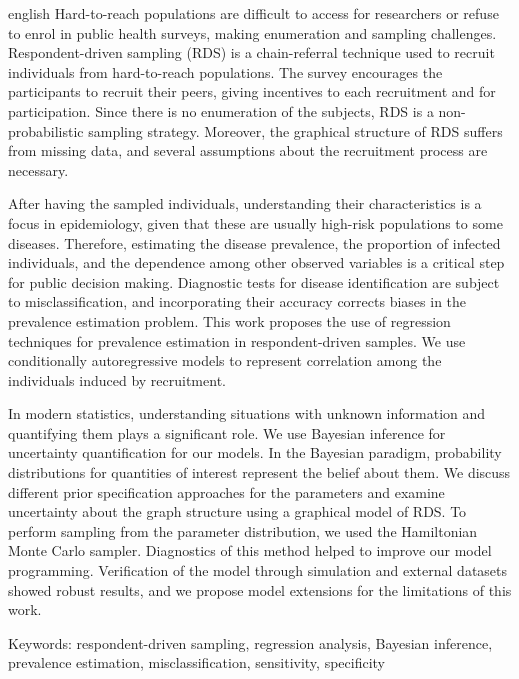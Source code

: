 \setlength{\absparsep}{18pt} 

\begin{resumo}[Abstract]
 \begin{otherlanguage*}{english}
    Hard-to-reach populations are difficult to access for researchers or refuse to enrol in public health surveys, making enumeration and sampling challenges. Respondent-driven sampling (RDS) is a chain-referral technique used to recruit individuals from hard-to-reach populations. The survey encourages the participants to recruit their peers, giving incentives to each recruitment and for participation. Since there is no enumeration of the subjects, RDS is a non-probabilistic sampling strategy. Moreover, the graphical structure of RDS suffers from missing data, and several assumptions about the recruitment process are necessary. 
    
    After having the sampled individuals, understanding their characteristics
    is a focus in epidemiology, given that these are usually high-risk
    populations to some diseases. Therefore, estimating the disease
    prevalence, the proportion of infected individuals, and the dependence
    among other observed variables is a critical step for public decision
    making. Diagnostic tests for disease identification are subject to
    misclassification, and incorporating their accuracy corrects biases in the
    prevalence estimation problem. This work proposes the use of regression
    techniques for prevalence estimation in respondent-driven samples. We use
    conditionally autoregressive models to represent correlation among the
    individuals induced by recruitment.
    
    In modern statistics, understanding situations with unknown information
    and quantifying them plays a significant role. We use Bayesian inference
    for uncertainty quantification for our models. In the Bayesian paradigm,
    probability distributions for quantities of interest represent the belief
    about them. We discuss different prior specification approaches for the
    parameters and examine uncertainty about the graph structure using a
    graphical model of RDS. To perform sampling from the parameter
    distribution, we used the Hamiltonian Monte Carlo sampler. Diagnostics of
    this method helped to improve our model programming. Verification of the
    model through simulation and external datasets showed robust results, and
    we propose model extensions for the limitations of this work.
 \end{otherlanguage*}

 Keywords: respondent-driven sampling, regression analysis, Bayesian
 inference, prevalence estimation, misclassification, sensitivity, specificity
\end{resumo}

